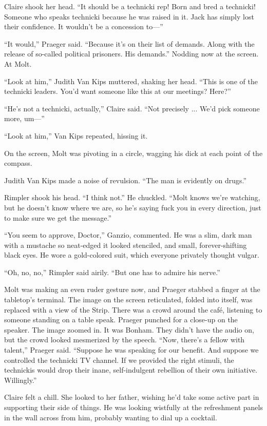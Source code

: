 Claire shook her head. ``It should be a technicki rep! Born and bred a technicki! Someone who speaks technicki because he was raised in it. Jack has simply lost their confidence. It wouldn't be a concession to—''

``It would,'' Praeger said. ``Because it's on their list of demands. Along with the release of so-called political prisoners. His demands.'' Nodding now at the screen. At Molt.

``Look at him,'' Judith Van Kips muttered, shaking her head. ``This is one of the technicki leaders. You'd want someone like this at our meetings? Here?''

``He's not a technicki, actually,'' Claire said. ``Not precisely ... We'd pick someone more, um—''

``Look at him,'' Van Kips repeated, hissing it.

On the screen, Molt was pivoting in a circle, wagging his dick at each point of the compass.

Judith Van Kips made a noise of revulsion. ``The man is evidently on drugs.''

Rimpler shook his head. ``I think not.'' He chuckled. ``Molt knows we're watching, but he doesn't know where we are, so he's saying fuck you in every direction, just to make sure we get the message.''

``You seem to approve, Doctor,'' Ganzio, commented. He was a slim, dark man with a mustache so neat-edged it looked stenciled, and small, forever-shifting black eyes. He wore a gold-colored suit, which everyone privately thought vulgar.

``Oh, no, no,'' Rimpler said airily. ``But one has to admire his nerve.''

Molt was making an even ruder gesture now, and Praeger stabbed a finger at the tabletop's terminal. The image on the screen reticulated, folded into itself, was replaced with a view of the Strip. There was a crowd around the café, listening to someone standing on a table speak. Praeger punched for a close-up on the speaker. The image zoomed in. It was Bonham. They didn't have the audio on, but the crowd looked mesmerized by the speech. ``Now, there's a fellow with talent,'' Praeger said. ``Suppose he was speaking for our benefit. And suppose we controlled the technicki TV channel. If we provided the right stimuli, the technickis would drop their inane, self-indulgent rebellion of their own initiative. Willingly.''

Claire felt a chill. She looked to her father, wishing he'd take some active part in supporting their side of things. He was looking wistfully at the refreshment panels in the wall across from him, probably wanting to dial up a cocktail.

